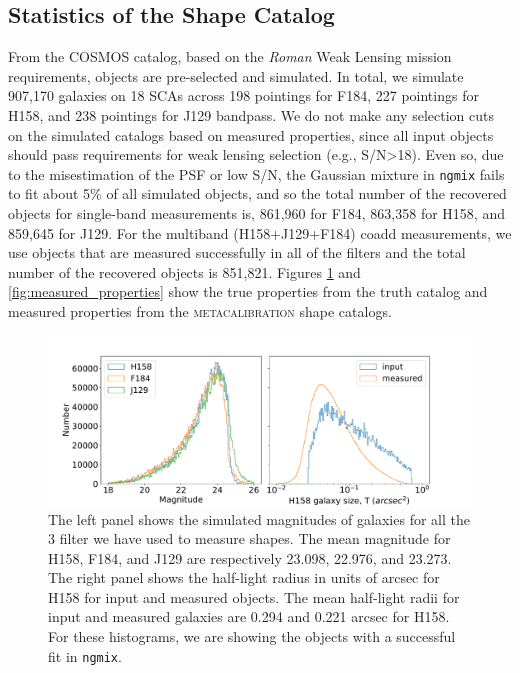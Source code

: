 \documentclass[fleqn,usenatbib]{mnras}
\begin{document}
\subsection{Statistics of the Shape Catalog}
From the COSMOS catalog, based on the \emph{Roman} Weak Lensing mission requirements, objects are pre-selected and simulated. In total, we simulate 907,170 galaxies on 18 SCAs across 198 pointings for F184, 227 pointings for H158, and 238 pointings for J129 bandpass. We do not make any selection cuts on the simulated catalogs based on measured properties, since all input objects should pass requirements for weak lensing selection (e.g., S/N>18). Even so, due to the misestimation of the PSF or low S/N, the Gaussian mixture in \texttt{ngmix} fails to fit about 5\% of all simulated objects, and so the total number of the recovered objects for single-band measurements is, 861,960 for F184, 863,358 for H158, and 859,645 for J129. For the multiband (H158+J129+F184) coadd measurements, we use objects that are measured successfully in all of the filters and the total number of the recovered objects is 851,821.
Figures \ref{fig:true_properties} and \ref{fig:measured_properties} show the true properties from the truth catalog and measured properties from the \textsc{metacalibration} shape catalogs. 

\begin{figure}
    \hspace*{-1.5cm}
	\includegraphics[scale=0.3]{true_properties.pdf}
	\centering
    \caption{The left panel shows the simulated magnitudes of galaxies for all the 3 filter we have used to measure shapes. The mean magnitude for H158, F184, and J129 are respectively 23.098, 22.976, and 23.273. The right panel shows the half-light radius in units of arcsec for H158 for input and measured objects. The mean half-light radii for input and measured galaxies are 0.294 and 0.221 arcsec for H158. For these histograms, we are showing the objects with a successful fit in \texttt{ngmix}.}
    \label{fig:true_properties}
\end{figure}
\end{document}
